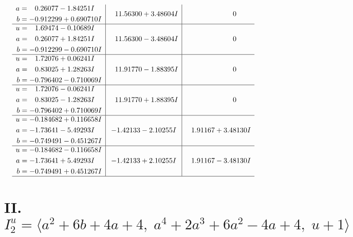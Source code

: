 \documentclass[1p]{elsarticle_modified}
\theoremstyle{definition}
\begin{document}
$$\begin{array}{c|c|c}
\begin{aligned}
a &= \phantom{-}0.26077 - 1.84251 I \\
b &= -0.912299 + 0.690710 I\end{aligned}
 & \phantom{-}11.56300 + 3.48604 I & \phantom{-0.000000 } 0 \\ \hline\begin{aligned}
u &= \phantom{-}1.69474 - 0.10689 I \\
a &= \phantom{-}0.26077 + 1.84251 I \\
b &= -0.912299 - 0.690710 I\end{aligned}
 & \phantom{-}11.56300 - 3.48604 I & \phantom{-0.000000 } 0 \\ \hline\begin{aligned}
u &= \phantom{-}1.72076 + 0.06241 I \\
a &= \phantom{-}0.83025 + 1.28263 I \\
b &= -0.796402 - 0.710069 I\end{aligned}
 & \phantom{-}11.91770 - 1.88395 I & \phantom{-0.000000 } 0 \\ \hline\begin{aligned}
u &= \phantom{-}1.72076 - 0.06241 I \\
a &= \phantom{-}0.83025 - 1.28263 I \\
b &= -0.796402 + 0.710069 I\end{aligned}
 & \phantom{-}11.91770 + 1.88395 I & \phantom{-0.000000 } 0 \\ \hline\begin{aligned}
u &= -0.184682 + 0.116658 I \\
a &= -1.73641 - 5.49293 I \\
b &= -0.749491 - 0.451267 I\end{aligned}
 & -1.42133 - 2.10255 I & \phantom{-}1.91167 + 3.48130 I \\ \hline\begin{aligned}
u &= -0.184682 - 0.116658 I \\
a &= -1.73641 + 5.49293 I \\
b &= -0.749491 + 0.451267 I\end{aligned}
 & -1.42133 + 2.10255 I & \phantom{-}1.91167 - 3.48130 I\\
 \hline 
 \end{array}$$\newpage\newpage\renewcommand{\arraystretch}{1}
\centering \section*{II. $I^u_{2}= \langle a^2+6 b+4 a+4,\;a^4+2 a^3+6 a^2-4 a+4,\;u+1 \rangle$}
\end{document}
